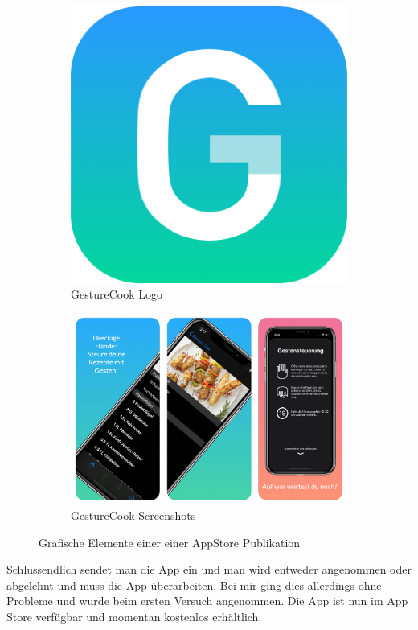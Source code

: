 \documentclass[12pt]{article}
\begin{document}
\begin{figure}
	\centering
	\begin{subfigure}[b]{0.3\linewidth}
    		\includegraphics[width=\linewidth]{pictures/GestureCookLogo.png}
    		\caption{GestureCook Logo}
    		\label{fig:logo}
    \end{subfigure}
    \begin{subfigure}[b]{0.5\linewidth}
    		\includegraphics[width=\linewidth]{pictures/Screenshot.png}
    		\caption{GestureCook Screenshots}
    		\label{fig:Screenshot}
    \end{subfigure}
    \caption{Grafische Elemente einer einer AppStore Publikation}
\end{figure}
Schlussendlich sendet man die App ein und man wird entweder angenommen oder abgelehnt und muss die App überarbeiten. Bei mir ging dies allerdings ohne Probleme und wurde beim ersten Versuch angenommen. Die App ist nun im App Store verfügbar und momentan kostenlos erhältlich.
\end{document}
